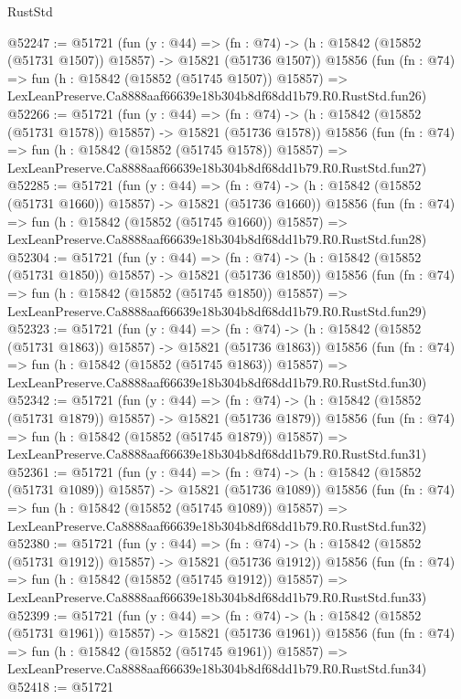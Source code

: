 \begin{lexlean}{RustStd}
\begin{coremodule}
@52247 := @51721
    (fun (y : @44) =>
    (fn : @74) -> (h : @15842 (@15852 (@51731 @1507)) @15857) -> @15821 (@51736 @1507))
    @15856
    (fun (fn : @74) =>
    fun (h : @15842 (@15852 (@51745 @1507)) @15857) =>
    LexLeanPreserve.Ca8888aaf66639e18b304b8df68dd1b79.R0.RustStd.fun26)
@52266 := @51721
    (fun (y : @44) =>
    (fn : @74) -> (h : @15842 (@15852 (@51731 @1578)) @15857) -> @15821 (@51736 @1578))
    @15856
    (fun (fn : @74) =>
    fun (h : @15842 (@15852 (@51745 @1578)) @15857) =>
    LexLeanPreserve.Ca8888aaf66639e18b304b8df68dd1b79.R0.RustStd.fun27)
@52285 := @51721
    (fun (y : @44) =>
    (fn : @74) -> (h : @15842 (@15852 (@51731 @1660)) @15857) -> @15821 (@51736 @1660))
    @15856
    (fun (fn : @74) =>
    fun (h : @15842 (@15852 (@51745 @1660)) @15857) =>
    LexLeanPreserve.Ca8888aaf66639e18b304b8df68dd1b79.R0.RustStd.fun28)
@52304 := @51721
    (fun (y : @44) =>
    (fn : @74) -> (h : @15842 (@15852 (@51731 @1850)) @15857) -> @15821 (@51736 @1850))
    @15856
    (fun (fn : @74) =>
    fun (h : @15842 (@15852 (@51745 @1850)) @15857) =>
    LexLeanPreserve.Ca8888aaf66639e18b304b8df68dd1b79.R0.RustStd.fun29)
@52323 := @51721
    (fun (y : @44) =>
    (fn : @74) -> (h : @15842 (@15852 (@51731 @1863)) @15857) -> @15821 (@51736 @1863))
    @15856
    (fun (fn : @74) =>
    fun (h : @15842 (@15852 (@51745 @1863)) @15857) =>
    LexLeanPreserve.Ca8888aaf66639e18b304b8df68dd1b79.R0.RustStd.fun30)
@52342 := @51721
    (fun (y : @44) =>
    (fn : @74) -> (h : @15842 (@15852 (@51731 @1879)) @15857) -> @15821 (@51736 @1879))
    @15856
    (fun (fn : @74) =>
    fun (h : @15842 (@15852 (@51745 @1879)) @15857) =>
    LexLeanPreserve.Ca8888aaf66639e18b304b8df68dd1b79.R0.RustStd.fun31)
@52361 := @51721
    (fun (y : @44) =>
    (fn : @74) -> (h : @15842 (@15852 (@51731 @1089)) @15857) -> @15821 (@51736 @1089))
    @15856
    (fun (fn : @74) =>
    fun (h : @15842 (@15852 (@51745 @1089)) @15857) =>
    LexLeanPreserve.Ca8888aaf66639e18b304b8df68dd1b79.R0.RustStd.fun32)
@52380 := @51721
    (fun (y : @44) =>
    (fn : @74) -> (h : @15842 (@15852 (@51731 @1912)) @15857) -> @15821 (@51736 @1912))
    @15856
    (fun (fn : @74) =>
    fun (h : @15842 (@15852 (@51745 @1912)) @15857) =>
    LexLeanPreserve.Ca8888aaf66639e18b304b8df68dd1b79.R0.RustStd.fun33)
@52399 := @51721
    (fun (y : @44) =>
    (fn : @74) -> (h : @15842 (@15852 (@51731 @1961)) @15857) -> @15821 (@51736 @1961))
    @15856
    (fun (fn : @74) =>
    fun (h : @15842 (@15852 (@51745 @1961)) @15857) =>
    LexLeanPreserve.Ca8888aaf66639e18b304b8df68dd1b79.R0.RustStd.fun34)
@52418 := @51721

\end{coremodule}
\end{lexlean}
